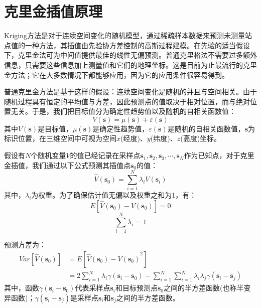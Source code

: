 \section{克里金插值原理}
Kriging方法是对于连续空间变化的随机模型，通过稀疏样本数据来预测未测量站点值的一种方法，其插值由先验协方差控制的高斯过程建模。在先验的适当假设下，克里金法可为中间值提供最佳的线性无偏预测。普通克里格法不需要过多额外信息，只需要这些信息加上测量值和它们的地理坐标。这是目前为止最流行的克里金方法；它在大多数情况下都能够应用，因为它的应用条件很容易得到。

普通克里金方法是基于这样的假设：连续空间变化是随机的并且与空间相关。由于随机过程具有恒定的平均值与方差，因此预测点的值取决于相对位置，而与绝对位置无关。于是，我们把目标值分为确定性趋势值以及随机的自相关函数值：
\begin{equation}
    V\left( \mathbf{s} \right) = \mu\left( \mathbf{s} \right) + \varepsilon\left( \mathbf{s} \right)
    \label{目标值分为确定性数值和随机自相关数值}
\end{equation}
其中$ V\left( \mathbf{s} \right) $是目标值，$ \mu\left( \mathbf{s} \right) $是确定性趋势值，$ \varepsilon\left( \mathbf{s} \right) $是随机的自相关函数值，$ \mathbf{s} $为标识位置，在三维空间中可视为空间$ x $(经度)、$ y $(纬度)、$ z $(高度)坐标。

假设有$ N $个随机变量$ V $的值已经记录在采样点$ \mathbf{s}_{1}, \mathbf{s}_{2}, \mathbf{s}_{3} , \cdots , \mathbf{s}_{N} $作为已知点，对于克里金插值，我们通过以下公式预测其插值点$ \mathbf{s}_{0} $的值：
\begin{equation}
    \hat{V}\left( \mathbf{s}_{0} \right) = \sum_{i=1}^{N} \lambda_{i} V\left( \mathbf{s}_{i} \right)
    \label{点克里金插值公式}
\end{equation}
其中，$ \lambda_{i} $为权重。为了确保估计值无偏以及权重之和为1，有：
\begin{equation}
    E\left[ \hat{V}\left( \mathbf{s}_{0} \right) - V\left( \mathbf{s}_{0} \right) \right] = 0
    \label{点克里金插值无偏}
\end{equation}
\begin{equation}
    \sum_{i=1}^{N} \lambda_{i} = 1
    \label{点克里金插值权重之和为1}
\end{equation}

预测方差为：
\begin{equation}
    \begin{split}
        Var\left[ \hat{V} \left( \mathbf{s}_{0} \right) \right]
        & = E\left[ {\hat{V}\left( \mathbf{s}_{0} \right) - V\left( \mathbf{s}_{0} \right)}^{2} \right]     \\
        & = 2 \sum_{i=1}^{N} \lambda_{i} \gamma\left( \mathbf{s}_{i} - \mathbf{s}_{0} \right) - \sum_{i=1}^{N} \sum_{i=1}^{N} \lambda_{i} \lambda_{j} \gamma\left( \mathbf{s}_{i} - \mathbf{s}_{j} \right)
    \end{split}
    \label{点克里金插值预测方差}
\end{equation}
其中，函数$ \gamma\left( \mathbf{s}_{i} - \mathbf{s}_{0} \right) $代表采样点$ \mathbf{s}_{i} $和目标预测点$ \mathbf{s}_{0} $之间的半方差函数(也称半变异函数)；$ \gamma\left( \mathbf{s}_{i} - \mathbf{s}_{j} \right) $是采样点$ \mathbf{s}_{i} $和$ \mathbf{s}_{j} $之间的半方差函数。


